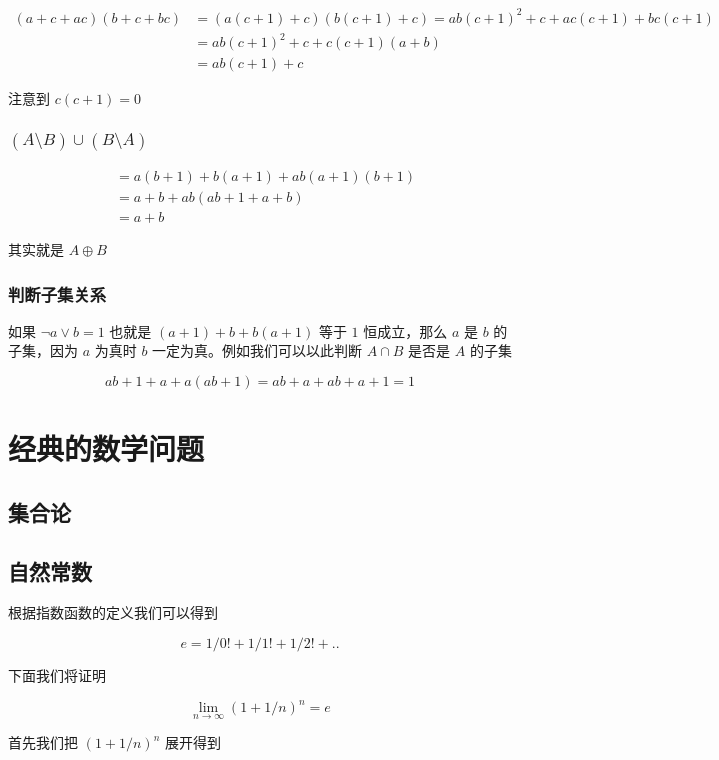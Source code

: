 \begin{align*}
(a + c + ac)(b + c + bc) &= (a(c+1) +c)(b(c+1) +c) = ab(c+1)^2 + c + ac(c+1) + bc(c+1) \\
    & = ab(c+1)^2 +c + c(c+1)(a+b) \\
    & = ab(c+1) + c
\end{align*}

注意到 $c(c+1) = 0$

\subsubsection{$(A \setminus B) \cup (B \setminus A)$}

\begin{align*}
    & = a(b+1) + b(a+1) + ab(a+1)(b+1) \\
    & = a + b + ab(ab + 1 + a+b) \\
    & = a + b
\end{align*}

其实就是 $A \oplus B$

\subsubsection{判断子集关系}

如果 $\neg a \lor b = 1$ 也就是 $ (a+1) + b + b(a+1)$ 等于 $1$ 恒成立，那么 $a$ 是 $b$ 的子集，因为 $a$ 为真时 $b$ 一定为真。例如我们可以以此判断 $A \cap B$ 是否是 $A$ 的子集

\[
ab+1 + a + a(ab+1) = ab + a + ab + a  + 1= 1
\]

\section{经典的数学问题}

\subsection{集合论}

\subsection{自然常数}

根据指数函数的定义我们可以得到

\[
e = 1/0! + 1/1! + 1/2! + .. 
\]

下面我们将证明

\[
\lim_{n \to \infty}(1+1/n)^n = e
\]

首先我们把 $(1+1/n)^n$ 展开得到

